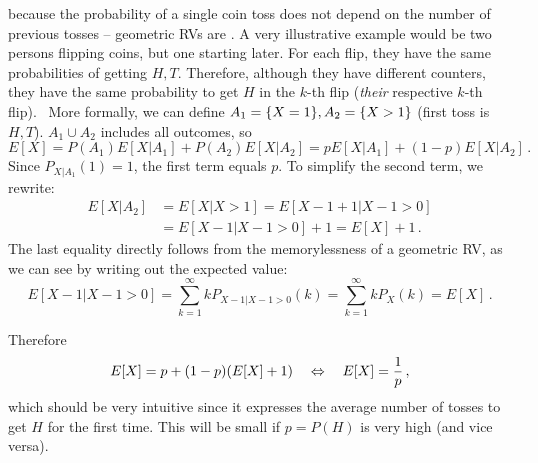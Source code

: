\begin{ex}[Memorylessness]
because the probability of a single coin toss does not depend on the number of previous tosses -- geometric RVs are . A very illustrative example would be two persons flipping coins, but one starting later. For each flip, they have the same probabilities of getting $H, T$. Therefore, although they have different counters, they have the same probability to get $H$ in the $k$-th flip (\emph{their} respective $k$-th flip).%
~More formally, we can define $A_1 = \qty{X = 1}, A_2 = \qty{X > 1}$ (first toss is $H, T$). $A_1 \cup A_2$ includes all outcomes, so
\begin{equation*}
E[X] = P(A_1) E[X | A_1] + P(A_2) E[X | A_2] = p E[X | A_1] + (1 - p) E[X | A_2] \, .
\end{equation*}
Since $P_{X | A_1}(1) = 1$, the first term equals $p$. To simplify the second term, we rewrite:
\begin{align*}
E[X | A_2] &= E[X | X > 1] = E[X - 1 + 1 | X - 1 > 0]
\\
&= E[X - 1 | X - 1 > 0] + 1 = E[X] + 1 \, .
\end{align*}
The last equality directly follows from the memorylessness of a geometric RV, as we can see by writing out the expected value:
\begin{equation*}
E[X - 1 | X - 1 > 0] = \sum_{k = 1}^\infty k P_{X - 1 | X - 1 > 0}(k) = \sum_{k = 1}^\infty k P_X(k) = E[X] \, .
\end{equation*}

Therefore
\begin{equation*}
E[X] = p + (1 - p) \qty(E[X] + 1) \quad \Leftrightarrow \quad E[X] = \frac{1}{p} \, ,
\end{equation*}
which should be very intuitive since it expresses the average number of tosses to get $H$ for the first time. This will be small if $p = P(H)$ is very high (and vice versa).
\end{ex}



